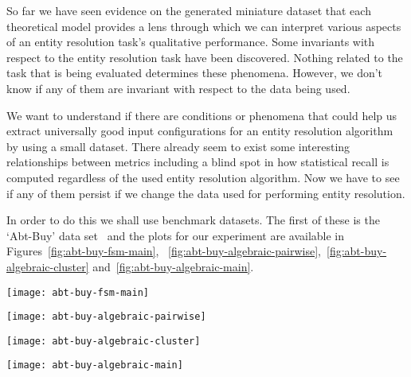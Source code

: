 So far we have seen evidence on the generated miniature dataset that each
theoretical model provides a lens through which we can interpret various aspects
of an entity resolution task's qualitative performance.
Some invariants with respect to the entity resolution task have been discovered.
Nothing related to the task that is being evaluated determines these phenomena.
However, we don't know if any of them are invariant with respect to the data
being used.

We want to understand if there are conditions or phenomena that could help us
extract universally good input configurations for an entity resolution algorithm
by using a small dataset.
There already seem to exist some interesting relationships between metrics
including a blind spot in how statistical recall is computed regardless of the
used entity resolution algorithm.
Now we have to see if any of them persist if we change the data used for
performing entity resolution.

In order to do this we shall use benchmark datasets.
The first of these is the `Abt-Buy' data set~\cite{vldb2010} and the plots for
our experiment are available in Figures~\ref{fig:abt-buy-fsm-main},
~\ref{fig:abt-buy-algebraic-pairwise},~\ref{fig:abt-buy-algebraic-cluster}
and~\ref{fig:abt-buy-algebraic-main}.

\begin{figure*}[ht]
    \begin{minipage}{0.24\textwidth}
        \centering
        \texttt{[image: abt-buy-fsm-main]}
        \caption{Abt-Buy statistical metrics.}
        \label{fig:abt-buy-fsm-main}
    \end{minipage}
    \begin{minipage}{0.24\textwidth}
        \centering
        \texttt{[image: abt-buy-algebraic-pairwise]}
        \caption{Abt-Buy pairwise metrics.}
        \label{fig:abt-buy-algebraic-pairwise}
    \end{minipage}
    \begin{minipage}{0.24\textwidth}
        \centering
        \texttt{[image: abt-buy-algebraic-cluster]}
        \caption{Abt-Buy cluster metrics.}
        \label{fig:abt-buy-algebraic-cluster}
    \end{minipage}
    \begin{minipage}{0.24\textwidth}
        \centering
        \texttt{[image: abt-buy-algebraic-main]}
        \caption{Abt-Buy clustering indexes.}
        \label{fig:abt-buy-algebraic-main}
    \end{minipage}
\end{figure*}\label{abt-buy}

